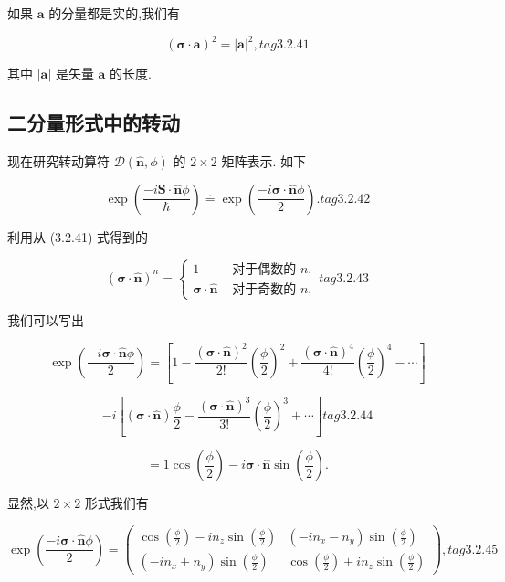 如果 $\mathbf{a}$ 的分量都是实的,我们有

$$
{\left( \mathbf{\sigma } \cdot \mathbf{a}\right) }^{2} = {\left| \mathbf{a}\right| }^{2}, tag{3. 2.41}
$$

其中 $\left| \mathbf{a}\right|$ 是矢量 $\mathbf{a}$ 的长度.

\subsection{二分量形式中的转动}

现在研究转动算符 $\mathcal{D}\left( {\widehat{\mathbf{n}},\phi }\right)$ 的 $2 \times 2$ 矩阵表示. 如下

$$
\exp \left( \frac{-i\mathbf{S} \cdot \widehat{\mathbf{n}}\phi }{\hslash }\right) \doteq \exp \left( \frac{-i\mathbf{\sigma } \cdot \widehat{\mathbf{n}}\phi }{2}\right) . tag{3. 2.42}
$$

利用从 (3.2.41) 式得到的

$$
{\left( \mathbf{\sigma } \cdot \widehat{\mathbf{n}}\right) }^{n} = \left\{ \begin{array}{ll} 1 & \text{ 对于偶数的 }n, \\ \mathbf{\sigma } \cdot \widehat{\mathbf{n}} & \text{ 对于奇数的 }n, \end{array}\right. tag{3.2.43}
$$

我们可以写出

$$
\exp \left( \frac{-i\mathbf{\sigma } \cdot \widehat{\mathbf{n}}\phi }{2}\right) = \left\lbrack {1 - \frac{{\left( \mathbf{\sigma } \cdot \widehat{\mathbf{n}}\right) }^{2}}{2!}{\left( \frac{\phi }{2}\right) }^{2} + \frac{{\left( \mathbf{\sigma } \cdot \widehat{\mathbf{n}}\right) }^{4}}{4!}{\left( \frac{\phi }{2}\right) }^{4} - \cdots }\right\rbrack
$$

$$
- i\left\lbrack {\left( {\mathbf{\sigma } \cdot \widehat{\mathbf{n}}}\right) \frac{\phi }{2} - \frac{{\left( \mathbf{\sigma } \cdot \widehat{\mathbf{n}}\right) }^{3}}{3!}{\left( \frac{\phi }{2}\right) }^{3} + \cdots }\right\rbrack tag{3. 2.44}
$$

$$
= 1\cos \left( \frac{\phi }{2}\right) - i\mathbf{\sigma } \cdot \widehat{\mathbf{n}}\sin \left( \frac{\phi }{2}\right) .
$$

显然,以 $2 \times 2$ 形式我们有

$$
\exp \left( \frac{-i\mathbf{\sigma } \cdot \widehat{\mathbf{n}}\phi }{2}\right) = \left( \begin{array}{ll} \cos \left( \frac{\phi }{2}\right) - i{n}_{z}\sin \left( \frac{\phi }{2}\right) & \left( {-i{n}_{x} - {n}_{y}}\right) \sin \left( \frac{\phi }{2}\right) \\ \left( {-i{n}_{x} + {n}_{y}}\right) \sin \left( \frac{\phi }{2}\right) & \cos \left( \frac{\phi }{2}\right) + i{n}_{z}\sin \left( \frac{\phi }{2}\right) \end{array}\right) , tag{3. 2.45}
$$

